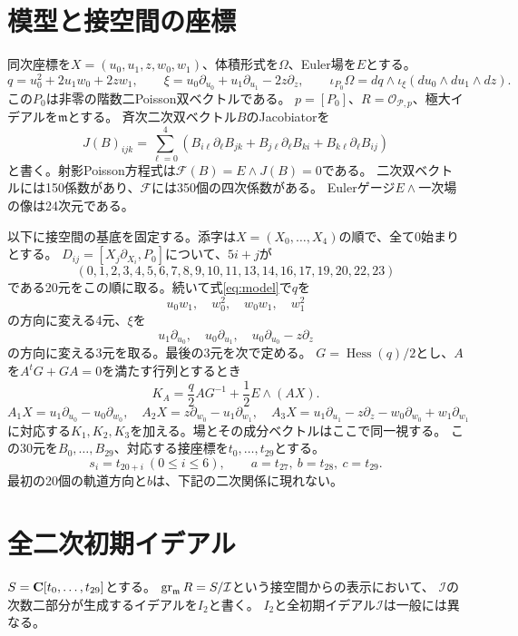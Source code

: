 \documentclass[a4paper,11pt]{ltjsarticle}
\theoremstyle{remark}\newtheorem{remark}[theorem]{注意}
\begin{document}
\section{模型と接空間の座標}
同次座標を$X=(u_0,u_1,z,w_0,w_1)$、体積形式を$\Omega$、Euler場を$E$とする。
\begin{equation}\label{eq:model}
 q=u_0^2+2u_1w_0+2zw_1,\qquad
 \xi=u_0\partial_{u_0}+u_1\partial_{u_1}-2z\partial_z,
 \qquad
 \iota_{P_0}\Omega=dq\wedge\iota_\xi(du_0\wedge du_1\wedge dz).
\end{equation}
この$P_0$は非零の階数二Poisson双ベクトルである。
$p=[P_0]$、$R=\mathcal O_{\mathcal P,p}$、極大イデアルを$\mathfrak m$とする。
斉次二次双ベクトル$B$のJacobiatorを
\[
 J(B)_{ijk}=\sum_{\ell=0}^4
 (B_{i\ell}\partial_\ell B_{jk}+B_{j\ell}\partial_\ell B_{ki}
                              +B_{k\ell}\partial_\ell B_{ij})
\]
と書く。射影Poisson方程式は$\mathcal F(B)=E\wedge J(B)=0$である。
二次双ベクトルには150係数があり、$\mathcal F$には350個の四次係数がある。
Eulerゲージ$E\wedge$一次場の像は24次元である。

以下に接空間の基底を固定する。添字は$X=(X_0,\ldots,X_4)$の順で、全て0始まりとする。
$D_{ij}=[X_j\partial_{X_i},P_0]$について、$5i+j$が
\[
 (0,1,2,3,4,5,6,7,8,9,10,11,13,14,16,17,19,20,22,23)
\]
である20元をこの順に取る。続いて式\eqref{eq:model}で$q$を
\[
 u_0w_1,\quad w_0^2,\quad w_0w_1,\quad w_1^2
\]
の方向に変える4元、$\xi$を
\[
 u_1\partial_{u_0},\quad u_0\partial_{u_1},\quad
 u_0\partial_{u_0}-z\partial_z
\]
の方向に変える3元を取る。最後の3元を次で定める。
$G=\operatorname{Hess}(q)/2$とし、$A$を$A^tG+GA=0$を満たす行列とするとき
\begin{equation}\label{eq:K}
 K_A=\frac q2AG^{-1}+\frac12E\wedge(AX).
\end{equation}
\[
 A_1X=u_1\partial_{u_0}-u_0\partial_{w_0},\quad
 A_2X=z\partial_{w_0}-u_1\partial_{w_1},\quad
 A_3X=u_1\partial_{u_1}-z\partial_z-w_0\partial_{w_0}+w_1\partial_{w_1}
\]
に対応する$K_1,K_2,K_3$を加える。場とその成分ベクトルはここで同一視する。
この30元を$B_0,\ldots,B_{29}$、対応する接座標を$t_0,\ldots,t_{29}$とする。
\begin{equation}\label{eq:coords}
 s_i=t_{20+i}\ (0\le i\le6),\qquad a=t_{27},\ b=t_{28},\ c=t_{29}.
\end{equation}
最初の20個の軌道方向と$b$は、下記の二次関係に現れない。

\section{全二次初期イデアル}
$S=\mathbf C[t_0,\ldots,t_{29}]$とする。
$\operatorname{gr}_{\mathfrak m}R=S/\mathcal I$という接空間からの表示において、
$\mathcal I$の次数二部分が生成するイデアルを$I_2$と書く。
$I_2$と全初期イデアル$\mathcal I$は一般には異なる。
\end{document}
